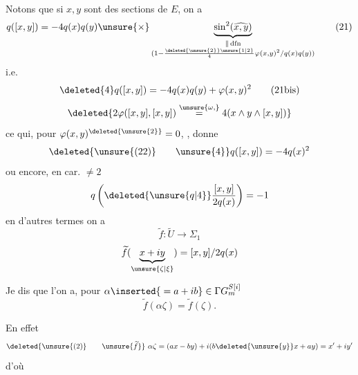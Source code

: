 
Notons que si $x,y$ sont des sections de $E$, on a
\[
q([x,y])=-4q(x)q(y)\unsure{\times}\underbrace{\sin^2(\widehat{x,y})}_{\substack{\Vert\,\mathrm{dfn}\\(1-\frac{\deleted{\unsure{2}}\unsure{1|2}}4\varphi(x,y)^2/q(x)q(y))}}\tag*{(21)}
\]
i.e.
\[
\deleted{4}q([x,y])=-4q(x)q(y)+\varphi(x,y)^2\tag*{(21bis)}
\]
\[
\deleted{2\varphi([x,y],[x,y])\overset{\unsure{\omega,}}{=}4(x\wedge y\wedge[x,y])}
\]
ce qui, pour $\varphi(x,y)^{\deleted{\unsure{2}}}=0$, , donne
\[
\deleted{\unsure{\text{(22)}}\qquad\unsure{4}}q([x,y])=-4q(x)^2
\]
ou encore, en car.  $\ne2$
\[
q\left(\deleted{\unsure{q|4}}\frac{[x,y]}{2q(x)}\right)=-1
\]
en d'autres termes on a
\[
\widetilde f:\widetilde U\longrightarrow\Sigma_1\tag*{(22)}
\]
\[
\widetilde f(\underbrace{x+iy}_{\unsure{\zeta|\xi}})=[x,y]/2q(x)
\]

Je dis que l'on a, pour $\alpha\inserted{{}=a+ib}\in\Gamma G_m^{S[i]}$
\[
\widetilde f(\alpha\zeta)=\widetilde f(\zeta).
\]

En effet
\[
\deleted{\unsure{(2)}\qquad\unsure{\widetilde f}}\ \alpha\zeta=(ax-by)+i(b\deleted{\unsure{y}}x+ay)=x'+iy'
\]
d'où
